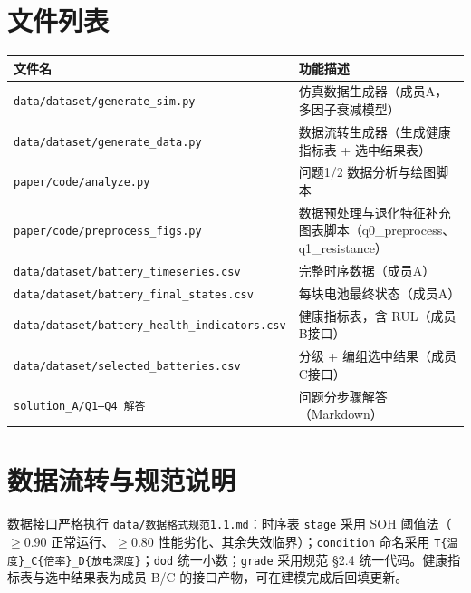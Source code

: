 \documentclass[withoutpreface]{cumcmthesis}
\begin{document}
\newpage
\begin{appendices}

\section{文件列表}
\begin{table}[H]
\centering
\begin{tabularx}{\textwidth}{LL}
\toprule
文件名 & 功能描述 \\
\midrule
\texttt{data/dataset/generate\_sim.py} & 仿真数据生成器（成员A，多因子衰减模型） \\
\texttt{data/dataset/generate\_data.py} & 数据流转生成器（生成健康指标表 + 选中结果表） \\
\texttt{paper/code/analyze.py} & 问题1/2 数据分析与绘图脚本 \\
\texttt{paper/code/preprocess\_figs.py} & 数据预处理与退化特征补充图表脚本（q0\_preprocess、q1\_resistance） \\
\texttt{data/dataset/battery\_timeseries.csv} & 完整时序数据（成员A） \\
\texttt{data/dataset/battery\_final\_states.csv} & 每块电池最终状态（成员A） \\
\texttt{data/dataset/battery\_health\_indicators.csv} & 健康指标表，含 RUL（成员B接口） \\
\texttt{data/dataset/selected\_batteries.csv} & 分级 + 编组选中结果（成员C接口） \\
\texttt{solution\_A/Q1--Q4 解答} & 问题分步骤解答（Markdown） \\
\bottomrule
\end{tabularx}
\label{tab:files}
\end{table}

\section{数据流转与规范说明}
数据接口严格执行 \texttt{data/数据格式规范1.1.md}：时序表 \texttt{stage} 采用 SOH 阈值法（$\ge0.90$ 正常运行、$\ge0.80$ 性能劣化、其余失效临界）；\texttt{condition} 命名采用 \texttt{T\{温度\}\_C\{倍率\}\_D\{放电深度\}}；\texttt{dod} 统一小数；\texttt{grade} 采用规范 §2.4 统一代码。健康指标表与选中结果表为成员 B/C 的接口产物，可在建模完成后回填更新。

\end{appendices}
\end{document}
